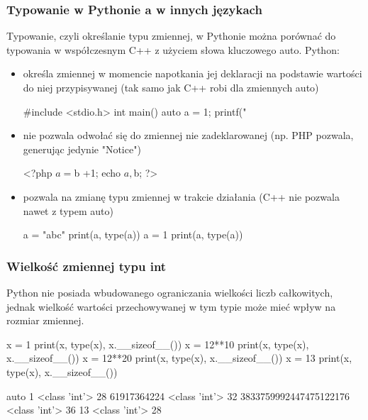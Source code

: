\subsubsection{Typowanie w Pythonie a w innych językach }

Typowanie, czyli określanie typu zmiennej, w Pythonie można porównać do typowania w współczesnym C++ z użyciem słowa kluczowego auto. Python:

\begin{itemize}
\item określa zmiennej w momencie napotkania jej deklaracji na podstawie wartości do niej przypisywanej (tak samo jak C++ robi dla zmiennych auto)
\begin{CodeFrame*}[cpp]{}
#include <stdio.h>
int main() {
  auto a = 1;
  printf("%
}
\end{CodeFrame*}
\item nie pozwala odwołać się do zmiennej nie zadeklarowanej (np. PHP pozwala, generując jedynie "Notice")
\begin{CodeFrame*}[php]{}
<?php
$a = $b +1;
echo $a, $b;
?>
\end{CodeFrame*}
\item pozwala na zmianę typu zmiennej w trakcie działania (C++ nie pozwala nawet z typem auto)
\begin{CodeFrame*}[python]{}
a = "abc"
print(a, type(a))
a = 1
print(a, type(a))
\end{CodeFrame*}
\end{itemize}

\subsubsection{Wielkość zmiennej typu int }

Python nie posiada wbudowanego ograniczania wielkości liczb całkowitych, jednak wielkość wartości przechowywanej w tym typie może mieć wpływ na rozmiar zmiennej.

\begin{CodeFrame}[python]{0.45\textwidth}
x = 1
print(x, type(x), x.__sizeof__())
x = 12**10
print(x, type(x), x.__sizeof__())
x = 12**20
print(x, type(x), x.__sizeof__())
x = 13
print(x, type(x), x.__sizeof__())
\end{CodeFrame}
\begin{CodeFrame}{auto}
1 <class 'int'> 28
61917364224 <class 'int'> 32
3833759992447475122176 <class 'int'> 36
13 <class 'int'> 28
\end{CodeFrame}
